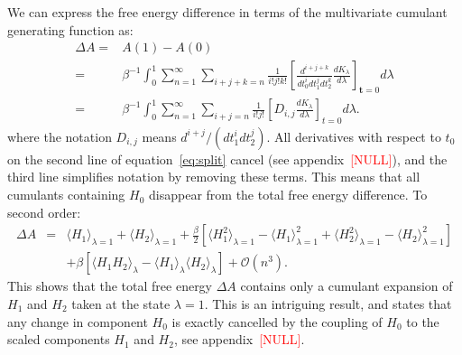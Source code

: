 \documentclass{article}
\newcommand{\warning}[1]{{\textsf{{\textcolor{red}{{[#1]}{}}}}}}
\let\vec\mathbf
\begin{document}
We can express the free energy difference in terms of the multivariate cumulant generating function as: 
\begin{align}
\Delta A =&  A(1) -  A(0) \nonumber \\
					 =&
					 \beta^{-1} \int_0^1  \sum_{n=1}^{\infty}
	        			\sum_{i+j+k=n}
            			\frac{1}{i!j!k!}\left[ \frac{d^{i+j+k}}{ d t_0^i d t_1^j d t_2^k} \frac{dK_\lambda}{d\lambda} \right]_{\vec t=0} d\lambda
				\nonumber \\	 =& 
	\beta^{-1} \int_0^1 \sum_{n=1}^{\infty}
	\sum_{i+j=n}
	\frac{1}{i!j!}
    \left[ D_{i,j} \frac{dK_\lambda}{d\lambda}\right]_{t=0} d\lambda
    \label{eq:split}.
\end{align}
where the notation $D_{i,j}$ means $d^{i+j} /(d t_1^i d t_2^j)$. All derivatives with respect to $t_0$ on the second line of equation~\ref{eq:split} cancel (see appendix~\warning{NULL}), and the third line simplifies notation by removing these terms. This means that all cumulants containing $H_0$ disappear from the total free energy difference. To second order: 
\begin{eqnarray}
\Delta A &=& 
 \langle  H_1 \rangle_{\lambda=1} + \langle  H_2 \rangle_{\lambda=1}  
+ \frac{\beta}{2} \left[ 
\langle  H_1^2 \rangle_{\lambda=1} -\langle  H_1 \rangle^2_{\lambda=1}  
 + \langle  H_2^2 \rangle_{\lambda=1} -\langle  H_2 \rangle^2_{\lambda=1}   \right] 
 \nonumber \\   & & 
 + \beta \left[ \langle  H_1 H_2\rangle_{\lambda} -\langle  H_1 \rangle_{\lambda} \langle  H_2 \rangle_{\lambda} 
   \right]
 + \mathcal{O} (n^3). 
\label{eq:O2_expansion_delta}
\end{eqnarray}
This shows that the total free energy $\Delta A $ contains only a cumulant expansion of $H_1$ and $H_2$ taken at the state $\lambda=1$. 
This is an intriguing result, and states that any change in component $H_0$ is exactly cancelled by the coupling of $H_0$ to the scaled components $H_1$ and $H_2$, see appendix~\warning{NULL}. 




\end{document}
